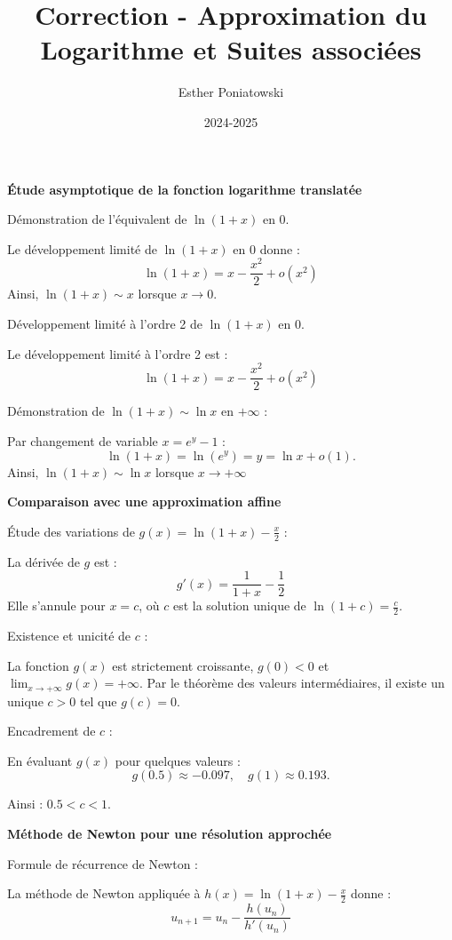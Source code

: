 \documentclass[10pt,a4paper]{article}
\title{Correction - Approximation du Logarithme et Suites associées}
\author{Esther Poniatowski}
\date{2024-2025}
\begin{document}
\textbf{Étude asymptotique de la fonction logarithme translatée}

\q Démonstration de l'équivalent de \( \ln(1+x) \) en 0.

Le développement limité de \( \ln(1+x) \) en 0 donne :
\[
\ln(1+x) = x - \frac{x^2}{2} + o(x^2)
\]
Ainsi, \( \ln(1+x) \sim x \) lorsque \( x \to 0 \).


\q Développement limité à l'ordre 2 de \( \ln(1+x) \) en 0.

Le développement limité à l'ordre 2 est :
\[
\ln(1+x) = x - \frac{x^2}{2} + o(x^2)
\]


\q Démonstration de \( \ln(1+x) \sim \ln x \) en \( +\infty \) :

Par changement de variable \( x = e^y -1 \) :
\[
\ln(1+x) = \ln(e^y) = y = \ln x + o(1).
\]
Ainsi, \( \ln(1+x) \sim \ln x \) lorsque \( x \to +\infty \)

\bigskip
\textbf{Comparaison avec une approximation affine}

\q Étude des variations de \( g(x) = \ln(1+x) - \frac{x}{2} \) :

La dérivée de \( g \) est :
\[
 g'(x) = \frac{1}{1+x} - \frac{1}{2}
\]
Elle s'annule pour \( x = c \), où \( c \) est la solution unique de \( \ln(1+c) = \frac{c}{2} \).


\q Existence et unicité de \( c \) :

La fonction \( g(x) \) est strictement croissante, \( g(0) < 0 \) et \( \lim_{x \to +\infty} g(x) =
+\infty \). Par le théorème des valeurs intermédiaires, il existe un unique \( c > 0 \) tel que \(
g(c) = 0 \).


\q Encadrement de \( c \) :

En évaluant \( g(x) \) pour quelques valeurs :
\[ g(0.5) \approx -0.097, \quad g(1) \approx 0.193. \]

Ainsi : \( 0.5 < c < 1 \).

\bigskip
\textbf{Méthode de Newton pour une résolution approchée}

\q Formule de récurrence de Newton :

La méthode de Newton appliquée à \( h(x) = \ln(1+x) - \frac{x}{2} \) donne :
\[
 u_{n+1} = u_n - \frac{h(u_n)}{h'(u_n)}
\]
\end{document}
